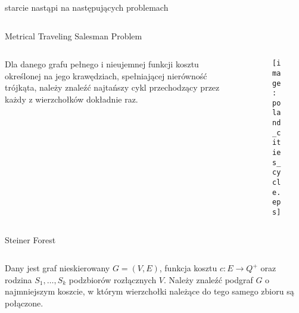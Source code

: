 \documentclass[final,hyperref={pdfpagelabels=false}]{beamer}
\begin{document}
\begin{frame}
  \begin{columns}
    \begin{column}{.96\textwidth}
      \vspace{1cm}
      \begin{center}
        \veryHuge starcie nastąpi na następujących problemach
      \end{center}
      \vspace{1cm}
    \end{column}
  \end{columns}

  \begin{columns}
    \begin{column}{.46\textwidth}
      \begin{block}{Metrical Traveling Salesman Problem}
        \begin{minipage}{\linewidth}
          \begin{columns}
            \begin{column}{.38\linewidth}
              Dla danego grafu pełnego i nieujemnej funkcji kosztu określonej na jego krawędziach, spełniającej nierówność trójkąta, należy znaleźć najtańszy
              cykl przechodzący przez każdy z wierzchołków dokładnie raz.
            \end{column}

            \begin{column}{.58\linewidth}
              \begin{figure}
                \centering
                \texttt{[image: poland\_cities\_cycle.eps]}
              \end{figure}
            \end{column}

          \end{columns}
        \end{minipage}
      \end{block}

      \begin{block}{Steiner Forest}
        \begin{minipage}{\linewidth}
          \begin{columns}
            \begin{column}{.58\linewidth}
              Dany jest graf nieskierowany $G = (V, E)$, funkcja kosztu $c: E \rightarrow Q^+$ oraz rodzina $S_1, \hdots, S_k$ podzbiorów rozłącznych $V$.
              Należy znaleźć podgraf $G$ o najmniejszym koszcie, w którym wierzchołki należące do tego samego zbioru są połączone.
            \end{column}


\end{columns}
\end{minipage}
\end{block}
\end{column}
\end{columns}
\end{frame}
\end{document}
